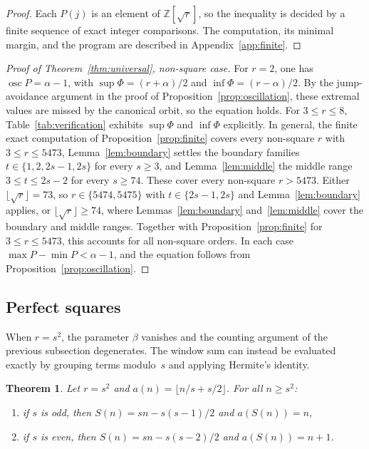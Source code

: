 \documentclass{birkjour}
\newtheorem{theorem}{Theorem}
\theoremstyle{definition}
\theoremstyle{remark}
\newcommand{\fl}[1]{\lfloor #1 \rfloor}
\begin{document}
\begin{proof}
Each $P(j)$ is an element of $\mathbb{Z}[\sqrt{r}]$, so the
inequality is decided by a finite sequence of exact integer
comparisons. The computation, its minimal margin, and the
program are described in Appendix~\ref{app:finite}.
\end{proof}

\begin{proof}[Proof of Theorem~\ref{thm:universal},
non-square case]
For $r=2$, one has $\operatorname{osc}P=\alpha-1$, with
$\sup\Phi=(r{+}\alpha)/2$ and $\inf\Phi=(r{-}\alpha)/2$. By the
jump-avoidance argument in the proof of
Proposition~\ref{prop:oscillation}, these extremal values are
missed by the canonical orbit, so the equation holds. For $3\le r\le 8$,
Table~\ref{tab:verification} exhibits $\sup\Phi$ and $\inf\Phi$
explicitly. In general, the finite exact computation of
Proposition~\ref{prop:finite} covers every non-square $r$ with
$3\le r\le 5473$, Lemma~\ref{lem:boundary} settles the boundary
families $t\in\{1,2,2s{-}1,2s\}$ for every $s\ge 3$, and
Lemma~\ref{lem:middle} the middle range $3\le t\le 2s-2$ for
every $s\ge 74$. These cover every non-square $r>5473$. Either
$\fl{\sqrt{r}}=73$, so $r\in\{5474,5475\}$ with
$t\in\{2s{-}1,2s\}$ and Lemma~\ref{lem:boundary} applies, or
$\fl{\sqrt{r}}\ge 74$, where Lemmas~\ref{lem:boundary}
and~\ref{lem:middle} cover the boundary and middle ranges.
Together with Proposition~\ref{prop:finite} for
$3\le r\le 5473$, this accounts for all non-square orders. In
each case $\max P-\min P<\alpha-1$, and the equation follows
from Proposition~\ref{prop:oscillation}.
\end{proof}

\subsection{Perfect squares}
\label{ssec:squares}

When $r=s^{2}$, the parameter $\beta$ vanishes
and the counting argument of the previous
subsection degenerates.
The window sum can instead be evaluated exactly by grouping
terms modulo~$s$ and applying Hermite's identity.

\begin{theorem}\label{thm:square}
Let $r=s^{2}$ and $a(n)=\fl{n/s+s/2}$.
For all $n\ge s^{2}$:
\begin{enumerate}
\item if $s$ is odd, then
  $S(n)=sn-s(s{-}1)/2$
  and $a(S(n))=n$,
\item if $s$ is even, then
  $S(n)=sn-s(s{-}2)/2$
  and $a(S(n))=n+1$.
\end{enumerate}
\end{theorem}
\end{document}
